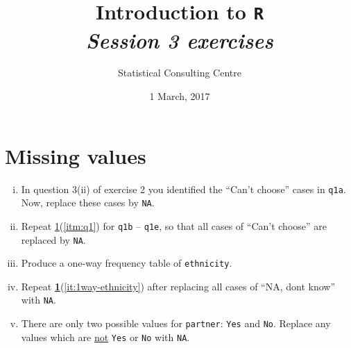 \documentclass[12pt,a4paper]{article}\usepackage[]{graphicx}\usepackage[]{color}
\begin{document}
\setlength\parindent{0cm}
\title{\Large{\textbf{Introduction to \texttt{R}}}\\
\textit{Session 3 exercises}}
\author{Statistical Consulting Centre}
\date{1 March, 2017}
\maketitle
 

\section{Missing values}
\label{sec:missing}

\begin{enumerate}[(i)]
\item \label{itm:q1} In question 3(ii) of exercise 2 you identified the ``Can't choose'' cases in \texttt{q1a}. Now, replace these cases by
  \texttt{NA}.
\item Repeat \ref{sec:missing}(\ref{itm:q1}) for \texttt{q1b} -- \texttt{q1e}, so that all cases of ``Can't choose'' are replaced by \texttt{NA}.
\item \label{it:1way-ethnicity} Produce a one-way frequency table of \texttt{ethnicity}.
\item Repeat {\bf \ref{sec:missing}}(\ref{it:1way-ethnicity}) after replacing all cases of ``NA, dont know'' with \texttt{NA}.
\item There are only two possible values for \texttt{partner}:
  \texttt{Yes} and \texttt{No}. Replace any values which are \underline{not} \texttt{Yes} or \texttt{No} with \texttt{NA}.

\end{enumerate}
\end{document}
